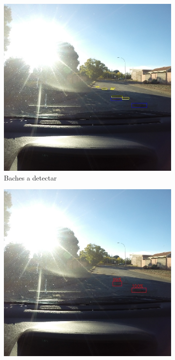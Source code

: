 \begin{figure}[H]
	\centering
	\begin{subfigure}[h]{0.45\linewidth}
		\includegraphics[width=\linewidth]{images/results_d_gt.jpg}
		\caption{Baches a detectar}
	\end{subfigure}
	\begin{subfigure}[h]{0.45\linewidth}
		\includegraphics[width=\linewidth]{images/results_d_yolo_v3_256.jpg}

\end{subfigure}
\end{figure}
